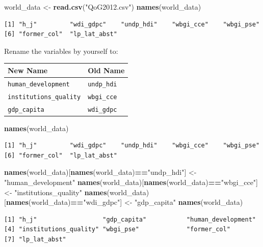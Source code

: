 \documentclass[]{article}
\newenvironment{Shaded}{\begin{snugshade}}{\end{snugshade}}
\newcommand{\KeywordTok}[1]{\textcolor[rgb]{0.13,0.29,0.53}{\textbf{#1}}}
\newcommand{\NormalTok}[1]{#1}
\newcommand{\OperatorTok}[1]{\textcolor[rgb]{0.81,0.36,0.00}{\textbf{#1}}}
\newcommand{\StringTok}[1]{\textcolor[rgb]{0.31,0.60,0.02}{#1}}
\begin{document}
\begin{Shaded}
\begin{Highlighting}[]
\NormalTok{world_data <-}\StringTok{ }\KeywordTok{read.csv}\NormalTok{(}\StringTok{"QoG2012.csv"}\NormalTok{)}
\KeywordTok{names}\NormalTok{(world_data)}
\end{Highlighting}
\end{Shaded}

\begin{verbatim}
[1] "h_j"         "wdi_gdpc"    "undp_hdi"    "wbgi_cce"    "wbgi_pse"   
[6] "former_col"  "lp_lat_abst"
\end{verbatim}

Rename the variables by yourself to:

\begin{longtable}[]{@{}ll@{}}
\toprule
New Name & Old Name\tabularnewline
\midrule
\endhead
\texttt{human\_development} & \texttt{undp\_hdi}\tabularnewline
\texttt{institutions\_quality} & \texttt{wbgi\_cce}\tabularnewline
\texttt{gdp\_capita} & \texttt{wdi\_gdpc}\tabularnewline
\bottomrule
\end{longtable}

\begin{Shaded}
\begin{Highlighting}[]
\KeywordTok{names}\NormalTok{(world_data)}
\end{Highlighting}
\end{Shaded}

\begin{verbatim}
[1] "h_j"         "wdi_gdpc"    "undp_hdi"    "wbgi_cce"    "wbgi_pse"   
[6] "former_col"  "lp_lat_abst"
\end{verbatim}

\begin{Shaded}
\begin{Highlighting}[]
\KeywordTok{names}\NormalTok{(world_data)[}\KeywordTok{names}\NormalTok{(world_data)}\OperatorTok{==}\StringTok{"undp_hdi"}\NormalTok{] <-}\StringTok{ "human_development"}
\KeywordTok{names}\NormalTok{(world_data)[}\KeywordTok{names}\NormalTok{(world_data)}\OperatorTok{==}\StringTok{"wbgi_cce"}\NormalTok{] <-}\StringTok{ "institutions_quality"}
\KeywordTok{names}\NormalTok{(world_data)[}\KeywordTok{names}\NormalTok{(world_data)}\OperatorTok{==}\StringTok{"wdi_gdpc"}\NormalTok{] <-}\StringTok{ "gdp_capita"}
\KeywordTok{names}\NormalTok{(world_data)}
\end{Highlighting}
\end{Shaded}

\begin{verbatim}
[1] "h_j"                  "gdp_capita"           "human_development"   
[4] "institutions_quality" "wbgi_pse"             "former_col"          
[7] "lp_lat_abst"         
\end{verbatim}
\end{document}
